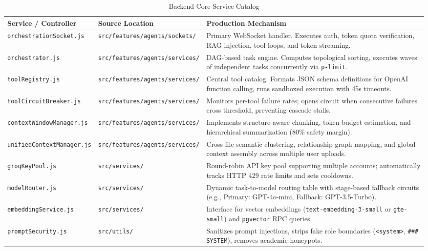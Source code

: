 \documentclass[10pt,a4paper]{article}
\begin{document}
\begin{table}[h!]
\centering
\small
\begin{tabularx}{\linewidth}{p{4.4cm}p{4.4cm}X}
\toprule
\textbf{Service / Controller} & \textbf{Source Location} & \textbf{Production Mechanism} \\
\midrule
\texttt{orchestrationSocket.js} & \texttt{src/features/agents/sockets/} & Primary WebSocket handler. Executes auth, token quota verification, RAG injection, tool loops, and token streaming. \\
\addlinespace
\texttt{orchestrator.js} & \texttt{src/features/agents/services/} & DAG-based task engine. Computes topological sorting, executes waves of independent tasks concurrently via \texttt{p-limit}. \\
\addlinespace
\texttt{toolRegistry.js} & \texttt{src/features/agents/services/} & Central tool catalog. Formats JSON schema definitions for OpenAI function calling, runs sandboxed execution with 45s timeouts. \\
\addlinespace
\texttt{toolCircuitBreaker.js} & \texttt{src/features/agents/services/} & Monitors per-tool failure rates; opens circuit when consecutive failures cross threshold, preventing cascade stalls. \\
\addlinespace
\texttt{contextWindowManager.js} & \texttt{src/features/agents/services/} & Implements structure-aware chunking, token budget estimation, and hierarchical summarization (80\% safety margin). \\
\addlinespace
\texttt{unifiedContextManager.js} & \texttt{src/features/agents/services/} & Cross-file semantic clustering, relationship graph mapping, and global context assembly across multiple user uploads. \\
\addlinespace
\texttt{groqKeyPool.js} & \texttt{src/services/} & Round-robin API key pool supporting multiple accounts; automatically tracks HTTP 429 rate limits and sets cooldowns. \\
\addlinespace
\texttt{modelRouter.js} & \texttt{src/services/} & Dynamic task-to-model routing table with stage-based fallback circuits (e.g., Primary: GPT-4o-mini, Fallback: GPT-3.5-Turbo). \\
\addlinespace
\texttt{embeddingService.js} & \texttt{src/services/} & Interface for vector embeddings (\texttt{text-embedding-3-small} or \texttt{gte-small}) and \texttt{pgvector} RPC queries. \\
\addlinespace
\texttt{promptSecurity.js} & \texttt{src/utils/} & Sanitizes prompt injections, strips fake role boundaries (\texttt{<system>}, \texttt{\#\#\# SYSTEM}), removes academic honeypots. \\
\bottomrule
\end{tabularx}
\caption{Backend Core Service Catalog}
\end{table}
\end{document}
